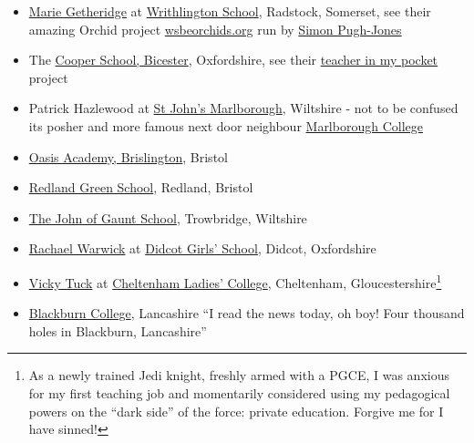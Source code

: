 \documentclass[
]{book}
\providecommand{\tightlist}{%
  \setlength{\itemsep}{0pt}\setlength{\parskip}{0pt}}
\begin{document}
\begin{itemize}
\tightlist
\item
  \href{https://wessexlearningtrust.co.uk/teammembers/marie-getheridge/}{Marie Getheridge} at \href{https://en.wikipedia.org/wiki/Writhlington_School}{Writhlington School}, Radstock, Somerset, see their amazing Orchid project \href{https://wsbeorchids.org/thirty-years-of-the-writhlington-schools-orchid-project-a-teachers-view-by-simon-pugh-jones/}{wsbeorchids.org} run by \href{https://www.bristol.ac.uk/graduation/honorary-degrees/honorary-graduates-2019/simon-pugh-jones/}{Simon Pugh-Jones}
\item
  The \href{https://en.wikipedia.org/wiki/Cooper_School,_Bicester}{Cooper School, Bicester}, Oxfordshire, see their \href{https://www.youtube.com/watch?v=XdywHl2ZA-I}{teacher in my pocket} project
\item
  Patrick Hazlewood at \href{https://en.wikipedia.org/wiki/St_John\%27s_Marlborough}{St John's Marlborough}, Wiltshire - not to be confused its posher and more famous next door neighbour \href{https://en.wikipedia.org/wiki/Marlborough_College}{Marlborough College}
\item
  \href{https://en.wikipedia.org/wiki/Oasis_Academy_Brislington}{Oasis Academy, Brislington}, Bristol
\item
  \href{https://en.wikipedia.org/wiki/Redland_Green_School}{Redland Green School}, Redland, Bristol
\item
  \href{https://en.wikipedia.org/wiki/The_John_of_Gaunt_School}{The John of Gaunt School}, Trowbridge, Wiltshire
\item
  \href{https://twitter.com/rachaelwarwick7}{Rachael Warwick} at \href{https://en.wikipedia.org/wiki/Didcot_Girls\%27_School}{Didcot Girls' School}, Didcot, Oxfordshire
\item
  \href{https://www.rsacademics.com/team/vicky-tuck/}{Vicky Tuck} at \href{https://en.wikipedia.org/wiki/Cheltenham_Ladies\%27_College}{Cheltenham Ladies' College}, Cheltenham, Gloucestershire\footnote{As a newly trained Jedi knight, freshly armed with a PGCE, I was anxious for my first teaching job and momentarily considered using my pedagogical powers on the ``dark side'' of the force: private education. \citep{nicebutdim} Forgive me for I have sinned!}
\item
  \href{https://en.wikipedia.org/wiki/Blackburn_College,_Lancashire}{Blackburn College}, Lancashire ``I read the news today, oh boy! Four thousand holes in Blackburn, Lancashire'' \citep{adayinthelife}
\end{itemize}
\end{document}
